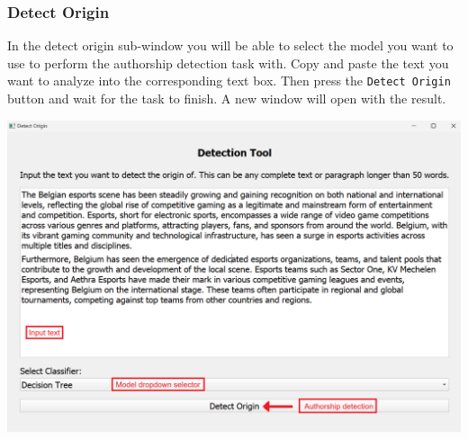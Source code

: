 \subsubsection{Detect Origin}
In the detect origin sub-window you will be able to select the model you want to use to perform the authorship detection task with. Copy and paste the text you want to analyze into the corresponding text box. Then press the \texttt{Detect Origin} button and wait for the task to finish. A new window will open with the result.
\begin{center}
    \includegraphics[width=17cm]{Images/Usage/Local/Detect-Origin-Window.png}
\end{center}
\clearpage
